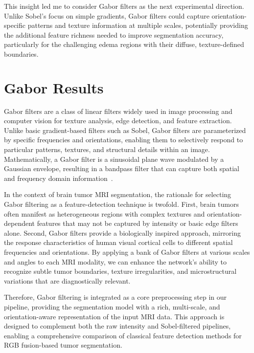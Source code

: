 This insight led me to consider Gabor filters as the next experimental direction. Unlike Sobel's focus on simple gradients, Gabor filters could capture orientation-specific patterns and texture information at multiple scales, potentially providing the additional feature richness needed to improve segmentation accuracy, particularly for the challenging edema regions with their diffuse, texture-defined boundaries.



\section{Gabor Results}
\label{sec:gabor_results}

Gabor filters are a class of linear filters widely used in image processing and computer vision for texture analysis, edge detection, and feature extraction. Unlike basic gradient-based filters such as Sobel, Gabor filters are parameterized by specific frequencies and orientations, enabling them to selectively respond to particular patterns, textures, and structural details within an image. Mathematically, a Gabor filter is a sinusoidal plane wave modulated by a Gaussian envelope, resulting in a bandpass filter that can capture both spatial and frequency domain information~\cite{gabor1946theory,fathi2013automatic}.

In the context of brain tumor MRI segmentation, the rationale for selecting Gabor filtering as a feature-detection technique is twofold. First, brain tumors often manifest as heterogeneous regions with complex textures and orientation-dependent features that may not be captured by intensity or basic edge filters alone. Second, Gabor filters provide a biologically inspired approach, mirroring the response characteristics of human visual cortical cells to different spatial frequencies and orientations. By applying a bank of Gabor filters at various scales and angles to each MRI modality, we can enhance the network's ability to recognize subtle tumor boundaries, texture irregularities, and microstructural variations that are diagnostically relevant.

Therefore, Gabor filtering is integrated as a core preprocessing step in our pipeline, providing the segmentation model with a rich, multi-scale, and orientation-aware representation of the input MRI data. This approach is designed to complement both the raw intensity and Sobel-filtered pipelines, enabling a comprehensive comparison of classical feature detection methods for RGB fusion-based tumor segmentation.




